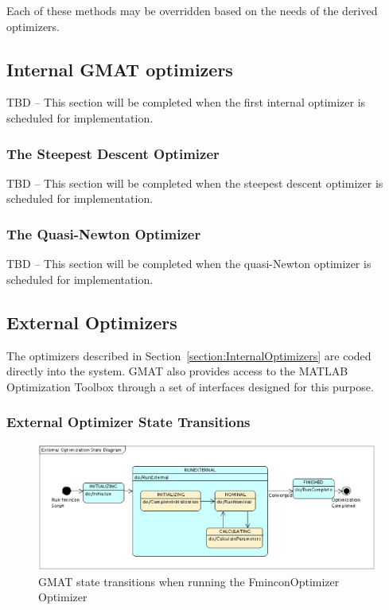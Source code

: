 \noindent Each of these methods may be overridden based on the needs of the derived optimizers.

\subsection{\label{section:InternalOptimizers}Internal GMAT optimizers}

TBD -- This section will be completed when the first internal optimizer is scheduled for
implementation.

\subsubsection{The Steepest Descent Optimizer}

TBD -- This section will be completed when the steepest descent optimizer is scheduled for
implementation.

\subsubsection{The Quasi-Newton Optimizer}

TBD -- This section will be completed when the quasi-Newton optimizer is scheduled for
implementation.

\subsection{External Optimizers}

The optimizers described in Section~\ref{section:InternalOptimizers} are coded directly into the
system.  GMAT also provides access to the MATLAB Optimization Toolbox\cite{opttools} through a set
of interfaces designed for this purpose.

\subsubsection{\label{section:ExternalOptimizationStateMachine}External Optimizer State Transitions}

\begin{figure}
\begin{center}
\includegraphics[scale=0.5]{Images/ExternalOptimizationStateDiagram.eps}
\caption{\label{figure:ExternalOptimizationStateDiagram}GMAT state transitions when running the
FminconOptimizer Optimizer}
\end{center}
\end{figure}

